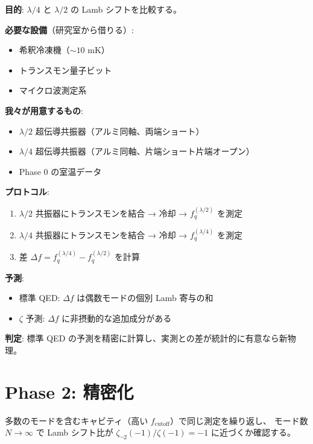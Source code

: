 \documentclass[12pt,a4paper]{article}
\begin{document}
\begin{expbox}
\textbf{目的}: $\lambda/4$ と $\lambda/2$ の Lamb シフトを比較する。

\textbf{必要な設備}（研究室から借りる）:
\begin{itemize}
\item 希釈冷凍機（$\sim 10$ mK）
\item トランスモン量子ビット
\item マイクロ波測定系
\end{itemize}

\textbf{我々が用意するもの}:
\begin{itemize}
\item $\lambda/2$ 超伝導共振器（アルミ同軸、両端ショート）
\item $\lambda/4$ 超伝導共振器（アルミ同軸、片端ショート片端オープン）
\item Phase 0 の室温データ
\end{itemize}

\textbf{プロトコル}:
\begin{enumerate}
\item $\lambda/2$ 共振器にトランスモンを結合 → 冷却 → $f_q^{(\lambda/2)}$ を測定
\item $\lambda/4$ 共振器にトランスモンを結合 → 冷却 → $f_q^{(\lambda/4)}$ を測定
\item 差 $\Delta f = f_q^{(\lambda/4)} - f_q^{(\lambda/2)}$ を計算
\end{enumerate}

\textbf{予測}:
\begin{itemize}
\item 標準 QED: $\Delta f$ は偶数モードの個別 Lamb 寄与の和
\item $\zeta$ 予測: $\Delta f$ に非摂動的な追加成分がある
\end{itemize}

\textbf{判定}: 標準 QED の予測を精密に計算し、実測との差が統計的に有意なら新物理。
\end{expbox}

\section{Phase 2: 精密化}

多数のモードを含むキャビティ（高い $f_{\text{cutoff}}$）で同じ測定を繰り返し、
モード数 $N \to \infty$ で Lamb シフト比が $\zeta_{\neg 2}(-1)/\zeta(-1) = -1$ に近づくか確認する。

\end{document}
